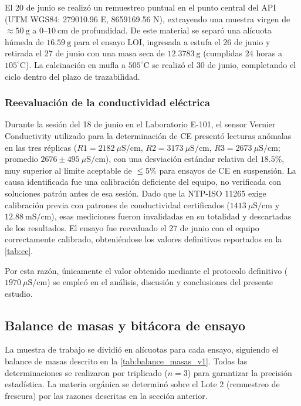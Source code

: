 \documentclass[fleqn]{jaes}
\begin{document}
El 20 de junio se realizó un remuestreo puntual en el punto central del API (UTM WGS84: 279010.96 E, 8659169.56 N), extrayendo una muestra virgen de $\approx 50~\text{g}$ a $0$--$10~\text{cm}$ de profundidad. De este material se separó una alícuota húmeda de $16.59~\text{g}$ para el ensayo LOI, ingresada a estufa el 26 de junio y retirada el 27 de junio con una masa seca de $12.3783~\text{g}$ (cumplidas $24$ horas a $105^{\circ}\text{C}$). La calcinación en mufla a $505^{\circ}\text{C}$ se realizó el 30 de junio, completando el ciclo dentro del plazo de trazabilidad.

\subsubsection{Reevaluación de la conductividad eléctrica}

Durante la sesión del 18 de junio en el Laboratorio E-101, el sensor Vernier Conductivity utilizado para la determinación de CE presentó lecturas anómalas en las tres réplicas ($R1 = 2182~\mu\text{S/cm}$, $R2 = 3173~\mu\text{S/cm}$, $R3 = 2673~\mu\text{S/cm}$; promedio $2676 \pm 495~\mu\text{S/cm}$), con una desviación estándar relativa del $18.5\%$, muy superior al límite aceptable de $\leq 5\%$ para ensayos de CE en suspensión. La causa identificada fue una calibración deficiente del equipo, no verificada con soluciones patrón antes de esa sesión. Dado que la NTP-ISO 11265 \cite{INACAL2018} exige calibración previa con patrones de conductividad certificados ($1413~\mu\text{S/cm}$ y $12.88~\text{mS/cm}$), esas mediciones fueron invalidadas en su totalidad y descartadas de los resultados. El ensayo fue reevaluado el 27 de junio con el equipo correctamente calibrado, obteniéndose los valores definitivos reportados en la \cref{tab:ce}.

Por esta razón, únicamente el valor obtenido mediante el protocolo definitivo ($1970~\mu\text{S/cm}$) se empleó en el análisis, discusión y conclusiones del presente estudio.

\subsection{Balance de masas y bitácora de ensayo}

La muestra de trabajo se dividió en alícuotas para cada ensayo, siguiendo el balance de masas descrito en la \cref{tab:balance_masas_v1}. Todas las determinaciones se realizaron por triplicado ($n=3$) para garantizar la precisión estadística. La materia orgánica se determinó sobre el Lote 2 (remuestreo de frescura) por las razones descritas en la sección anterior.
\end{document}
